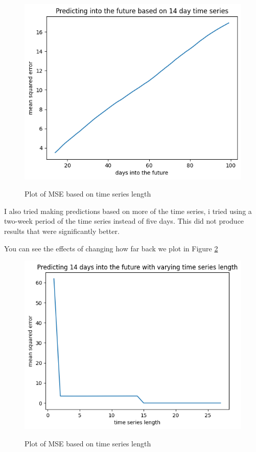 \documentclass{report}
\begin{document}
\begin{figure}
    \caption{Plot of MSE based on time series length}
    \centering
    \includegraphics[scale=0.5]{predicting_into_future_plot.png}
    \label{fig:extrapolation}
\end{figure}

I also tried making predictions based on more of the time series, i tried using a two-week period of the time series instead of five days. This did not produce results that were significantly better.

You can see the effects of changing how far back we plot in Figure \ref{fig:vary_time_series_length}

\begin{figure}
    \caption{Plot of MSE based on time series length}
    \centering
    \includegraphics[scale=0.5]{varying_length_plot.png}
    \label{fig:vary_time_series_length}
\end{figure}
\end{document}

